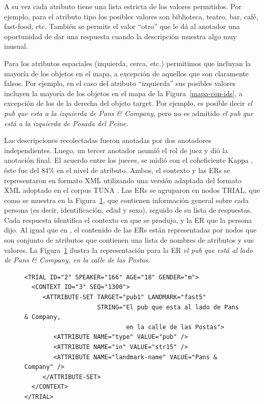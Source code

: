 A su vez cada atributo tiene una lista estricta de los valores permitidos. Por ejemplo, para el atributo tipo los posibles valores son biblioteca, teatro, bar, caf\'e, fast-food, etc. Tambi\'en se permite el valor ``otro'' que le d\'a al anotador una oportunidad de dar una respuesta cuando la descripci\'on muestra algo muy inusual.

Para los atributos espaciales (izquierda, cerca, etc.) permitimos que incluyan la mayor\'{i}a de los objetos en el mapa, a excepci\'on de aquellos que son claramente falsos. Por ejemplo, en el caso del atributo ``izquierda'' sus posibles valores incluyen la mayor\'{i}a de los objetos en el mapa de la Figura~\ref{mapa-con-ids}, a excepci\'on de los de la derecha del objeto target. Por ejemplo, es posible decir {\it el pub que esta a la izquierda de Pans \& Company}, pero no es admitido {\it el pub que est\'a a la izquierda de Posada del Peine}.




Las descripciones recolectadas fueron anotadas por dos anotadores independientes. Luego, un tercer anotador asumi\'o el rol de juez y di\'o la anotaci\'on final. El acuerdo entre los jueces, se midi\'o con el coheficiente Kappa \cite{kappa}, \'este fue del 84\% en el nivel de atributo.
Ambos, el contexto y las ERs se representaron en formato XML utilizando una versi\'on adaptada del formato XML adoptado en el corpus TUNA \cite{tuna-corpus}. Las ERs se agruparon en nodos TRIAL, que como se muestra en la Figura~\ref{xml}, que contienen informaci\'on general sobre cada persona (es decir, identificaci\'on, edad y sexo), seguido de su lista de respuestas. Cada respuesta identifica el contexto en que se produjo, y la ER que la persona dijo.
Al igual que en \cite{tuna-corpus}, el contenido de las ERs est\'an representadas por nodos que son conjunto de atributos que contienen una lista de nombres de atributos y sus valores. La Figura~\ref{xml} ilustra la representaci\'on para la ER {\it el pub que est\'a al lado de Pans \& Company, en la
calle de las Postas}.
\begin{figure}
\begin{verbatim}
<TRIAL ID="2" SPEAKER="166" AGE="18" GENDER="m">
  <CONTEXT ID="3" SEQ="1300">
     <ATTRIBUTE-SET TARGET="pub1" LANDMARK="fast5" 
                    STRING="El pub que esta al lado de Pans & Company, 
                            en la calle de las Postas">
        <ATTRIBUTE NAME="type" VALUE="pub" />
        <ATTRIBUTE NAME="in" VALUE="str15" />
        <ATTRIBUTE NAME="landmark-name" VALUE="Pans & Company" />
     </ATTRIBUTE-SET>
  </CONTEXT>
</TRIAL>	
\end{verbatim}
\caption{}\label{xml}
\end{figure}


